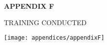 \begin{center}
	{\bf APPENDIX F}\\[24pt]
\end{center}
{\baselineskip
	
	\begin{center}
		TRAINING CONDUCTED
	\end{center}
	
	\begin{center}
		\texttt{[image: appendices/appendixF]}
	\end{center}
}